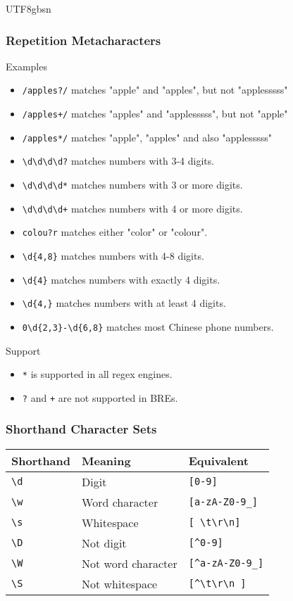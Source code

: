 \documentclass[red]{beamer}
\newcommand*{\lstverb}{\lstinline[style=caret]}
\begin{document}
\begin{CJK*}{UTF8}{gbsn}
\begin{frame}
\frametitle{Repetition Metacharacters}
\begin{block}{Examples}
\begin{itemize}
\scriptsize
	\item \lstverb|/apples?/| matches "apple" and "apples", but not "applesssss"
	\item \lstverb|/apples+/| matches "apples" and "applesssss", but not "apple"
	\item \lstverb|/apples*/| matches "apple", "apples" and also "applesssss"
	\item \lstverb|\d\d\d\d?| matches numbers with 3-4 digits.
	\item \lstverb|\d\d\d\d*| matches numbers with 3 or more digits.
	\item \lstverb|\d\d\d\d+| matches numbers with 4 or more digits.
	\item \lstverb|colou?r| matches either "color" or "colour".
	\item \lstverb|\d{4,8}| matches numbers with 4-8 digits.
	\item \lstverb|\d{4}| matches numbers with exactly 4 digits.
	\item \lstverb|\d{4,}| matches numbers with at least 4 digits.
	\item \lstverb|0\d{2,3}-\d{6,8}| matches most Chinese phone numbers.
\end{itemize}
\end{block}
\begin{block}{Support}
\begin{itemize}
	\item \lstverb|*| is supported in all regex engines.
	\item \lstverb|?| and \lstverb|+| are not supported in BREs.
\end{itemize}
\end{block}
\end{frame}

\begin{frame}
\frametitle{Shorthand Character Sets}
\begin{table}[ht]
\footnotesize
\renewcommand\arraystretch{1.6}
\begin{tabular}{lll}
\hline
\textbf{Shorthand} & \textbf{Meaning} & \textbf{Equivalent}\\
\hline
\lstverb|\d| & Digit & \lstverb|[0-9]|\\
\lstverb|\w| & Word character & \lstverb|[a-zA-Z0-9_]|\\
\lstverb|\s| & Whitespace & \lstverb|[ \t\r\n]|\\
\lstverb|\D| & Not digit & \lstverb|[^0-9]|\\
\lstverb|\W| & Not word character & \lstverb|[^a-zA-Z0-9_]|\\
\lstverb|\S| & Not whitespace & \lstverb|[^\t\r\n ]|\\
\hline
\end{tabular}
\end{table}
\end{frame}


\end{CJK*}
\end{document}
